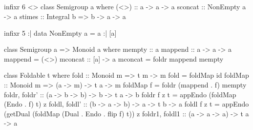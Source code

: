 \documentclass[11pt,a4paper]{article}
\begin{document}
\subsection{}
\begin{minipage}{0.47\textwidth}
\begin{hscode}
infixr 6 <>
class Semigroup a where
  (<>) :: a -> a -> a
  sconcat :: NonEmpty a -> a  
  stimes :: Integral b => b -> a -> a 

infixr 5 :|
data NonEmpty a = a :| [a] 
\end{hscode}
\end{minipage}
\hfill
\begin{minipage}{0.47\textwidth}
\begin{hscode}
class Semigroup a => Monoid a where
  mempty :: a  
  mappend :: a -> a -> a
  mappend = (<>)
  mconcat :: [a] -> a
  mconcat = foldr mappend mempty
\end{hscode}
\end{minipage}
\begin{hscode}
class Foldable t where
  fold :: Monoid m => t m -> m
  fold = foldMap id
  foldMap :: Monoid m => (a -> m) -> t a -> m
  foldMap f = foldr (mappend . f) mempty
  foldr, foldr' :: (a -> b -> b) -> b -> t a -> b
  foldr f z t = appEndo (foldMap (Endo . f) t) z
  foldl, foldl' :: (b -> a -> b) -> a -> t b -> a
  foldl f z t = appEndo (getDual (foldMap (Dual . Endo . flip f) t)) z
  foldr1, foldl1 :: (a -> a -> a) -> t a -> a
\end{hscode}
\end{document}
